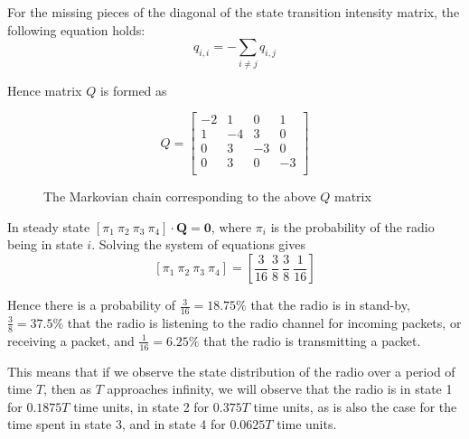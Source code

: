 For the missing pieces of the diagonal of the state transition intensity matrix,
the following equation holds:
$$q_{i,i} = -\sum_{i \neq j} q_{i,j}$$

Hence matrix $Q$ is formed as

\begin{equation*}
  Q =
  \begin{bmatrix}
    -2  & 1   & 0   & 1   \\
    1   & -4  & 3   & 0   \\
    0   & 3   & -3  & 0   \\
    0   & 3   & 0   & -3  \\
  \end{bmatrix}
\end{equation*}

\begin{figure}[H]
	\centering
	\scalebox{1}{}
	\caption{The Markovian chain corresponding to the above $Q$ matrix}
\end{figure}

In steady state $[\pi_1\ \pi_2\ \pi_3\ \pi_4] \cdot \mathbf{Q} = \mathbf{0}$,
where $\pi_i$ is the probability of the radio being in state $i$. Solving the
system of equations gives
$$[\pi_1\ \pi_2\ \pi_3\ \pi_4] = [\frac{3}{16}\ \frac{3}{8}\ \frac{3}{8}\ \frac{1}{16}]$$

Hence there is a probability of $\frac{3}{16}=18.75\%$ that the radio is in
stand-by, $\frac{3}{8}=37.5\%$ that the radio is listening to the radio channel
for incoming packets, or receiving a packet, and $\frac{1}{16} = 6.25\%$ that
the radio is transmitting a packet.

This means that if we observe the state distribution of the radio over a period
of time $T$, then as $T$ approaches infinity, we will observe that the radio is
in state 1 for $0.1875T$ time units, in state 2 for $0.375T$ time units, as is
also the case for the time spent in state 3, and in state 4 for $0.0625T$ time
units.
